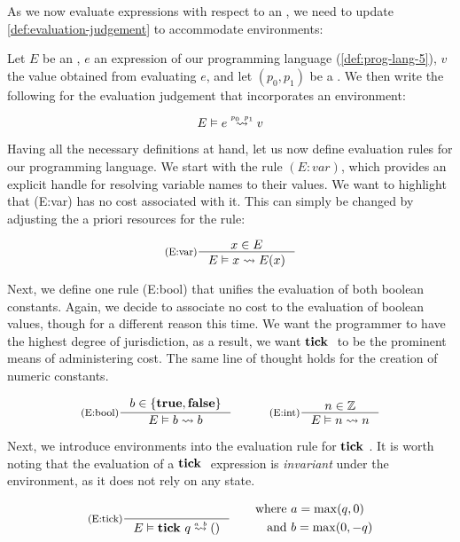 As we now evaluate expressions with respect to an , we need to update \cref{def:evaluation-judgement} to accommodate environments:

\begin{definition}\label{def:eval-judgement-environments}
   Let \(E\) be an , \(e\) an expression of our programming language (\cref{def:prog-lang-5}), \(v\) the value obtained from evaluating \(e\), and let \((p_0, p_1)\) be a . We then write the following for the evaluation judgement that incorporates an environment:

   \[
      \evals{E}{e}{v}{p_0}{p_1}
   \]
	
\end{definition}

Having all the necessary definitions at hand, let us now define evaluation rules for our programming language. We start with the rule \((E:var)\), which provides an explicit handle for resolving variable names to their values. We want to highlight that (E:var) has no cost associated with it. This can simply be changed by adjusting the a priori resources for the rule:

\[
   \inference[(E:var)]
   {\contains{E}{x}}
   {\evals{E}{x}{E(x)}{}{}}
\]

Next, we define one rule (E:bool) that unifies the evaluation of both boolean constants. Again, we decide to associate no cost to the evaluation of boolean values, though for a different reason this time. We want the programmer to have the highest degree of jurisdiction, as a result, we want \(\mathbf{tick}~\) to be the prominent means of administering cost. The same line of thought holds for the creation of numeric constants.

\[
   \inference[(E:bool)]{b \in \{\true, \false\}}{\evals{E}{b}{b}{}{}}%
   \quad\quad\quad
   \inference[(E:int)]{n \in \mathbb{Z}}{\evals{E}{n}{n}{}{}}
\]

Next, we introduce environments into the evaluation rule for \(\mathbf{tick}~\). It is worth noting that the evaluation of a \(\mathbf{tick}~\) expression is \emph{invariant} under the environment, as it does not rely on any state.

\[
   \inference[(E:tick)]
   {}
   {\evals{E}{\tick{q}}{()}{a}{b}}%
   \qquad 
   \begin{aligned}
      \text{where }  &a = \max(q, 0)\\
      \text{and }    &b = \max(0, -q) 
   \end{aligned}
\]

